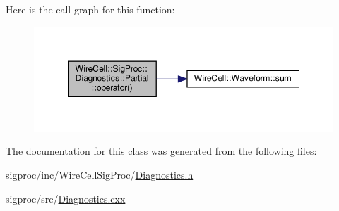 Here is the call graph for this function\+:
\nopagebreak
\begin{figure}[H]
\begin{center}
\leavevmode
\includegraphics[width=348pt]{class_wire_cell_1_1_sig_proc_1_1_diagnostics_1_1_partial_a59f6ea2384f9ca2b516ab25426ddb2d0_cgraph}
\end{center}
\end{figure}


The documentation for this class was generated from the following files\+:\begin{DoxyCompactItemize}
\item 
sigproc/inc/\+Wire\+Cell\+Sig\+Proc/\hyperlink{_diagnostics_8h}{Diagnostics.\+h}\item 
sigproc/src/\hyperlink{_diagnostics_8cxx}{Diagnostics.\+cxx}\end{DoxyCompactItemize}
